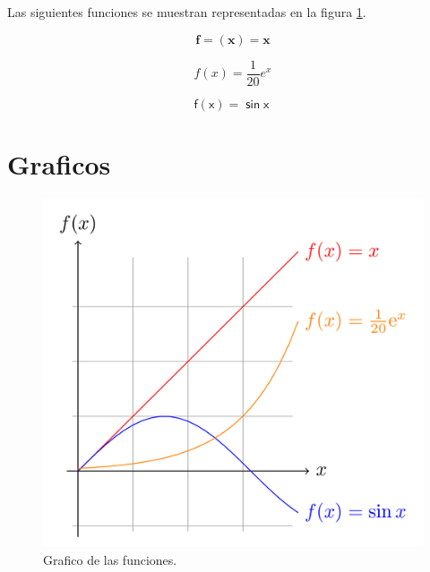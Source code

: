 \documentclass[10pt,a4paper]{report}
\begin{document}
Las siguientes funciones se muestran representadas en la figura \ref{grafica}.

\begin{center}
\begin{equation}
\mathbf{f=(x)=x}
\end{equation}
\end{center}
\begin{center}
\begin{equation}
\mathit{f(x)=\frac{1}{20}e^{x}}
\end{equation}
\end{center}
\begin{center}
\begin{equation}
\mathsf{f(x)=\sin x\:}
\end{equation}
\end{center}


\chapter*{Graficos}

\begin{figure}[!h]
\begin{center}
\includegraphics[scale=0.5]{grafico_ejercicio_final.png}
\caption{Grafico de las funciones.}
\label{grafica}
\end{center}
\end{figure}\ \\





\end{document}

